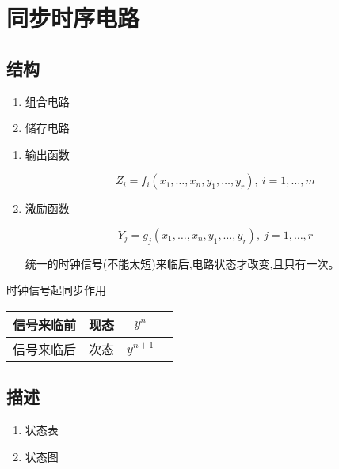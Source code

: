 \chapter{同步时序电路}
\newpage

\section{结构}

\begin{enumerate}

    \item 组合电路
    \item 储存电路

\end{enumerate}

\begin{enumerate}

\item 输出函数

\begin{equation}
    Z_i=f_i(x_1,\dots,x_n,y_1,\dots,y_r),~i=1,\dots,m
\end{equation}

\item 激励函数

\begin{equation}
    Y_j=g_j(x_1,\dots,x_n,y_1,\dots,y_r),~j=1,\dots,r
\end{equation}

统一的时钟信号(不能太短)来临后,电路状态才改变,且只有一次。

\end{enumerate}

\newpage

时钟信号起同步作用

\begin{table}[!htbp]
    \centering
    \begin{tabular}{lccc}
        \toprule
        信号来临前 & 现态 & $y^{n}$   \\
        \midrule
        信号来临后 & 次态 & $y^{n+1}$ \\
        \bottomrule
    \end{tabular}
\end{table}

\section{描述}

\begin{enumerate}
    \item 状态表
    \item 状态图
\end{enumerate}

